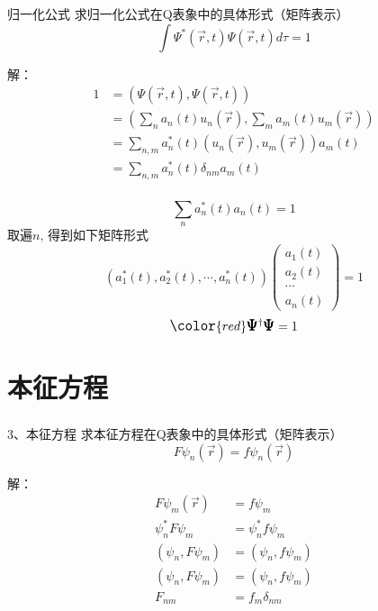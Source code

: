\begin{frame} 
    \frametitle{}
    \begin{tcolorbox1}{归一化公式}
        求归一化公式在Q表象中的具体形式（矩阵表示）
        $$ \int \Psi^* (\vec{r},t) \Psi(\vec{r},t) d\tau =1 $$
    \end{tcolorbox1}
    \alert{解：} 
    \begin{equation*}
        \begin{split}
            1 &=(\Psi(\vec{r},t), \Psi(\vec{r},t)) \\
            &= (\sum_n a_n(t) u_n(\vec{r}), \sum_m a_m(t) u_m(\vec{r}))\\
            &= \sum_{n,m} a_n ^*(t) (u_n(\vec{r}), u_m(\vec{r})) a_m(t)\\
            &= \sum_{n,m} a_n ^*(t) \delta_{nm} a_m(t)\\
        \end{split} 
    \end{equation*}
\end{frame}


\begin{frame} 
    $$  \sum_{n} a_n ^*(t) a_n(t) =1 $$
    取遍$n$, 得到如下矩阵形式\\
    $$ (a_1 ^*(t), a_2 ^*(t),\cdots,a_n^*(t) )
    \begin{pmatrix}
        a_1(t)\\
        a_2(t)\\
        \cdots \\
        a_n(t)
    \end{pmatrix}
    =1 $$ \vspace{1.0em} 
    $$ \large \color{red} \pmb {\Psi} ^{\dagger } \pmb {\Psi} =1 $$

\end{frame}

\section{本征方程}

\begin{frame} 
    \frametitle{}
    \begin{tcolorbox1}{3、本征方程}
        求本征方程在Q表象中的具体形式（矩阵表示）
        $$ F\psi_n (\vec{r}) =f \psi_n (\vec{r})$$
    \end{tcolorbox1}
    \alert{解：} 
    \begin{equation*}
        \begin{split}
            F\psi_m (\vec{r}) &=f \psi_m \\
            \psi_n ^*  F\psi_m &=\psi_n ^* f \psi_m\\
            (\psi_n, F\psi_m )&=(\psi_n, f \psi_m)\\
            (\psi_n, F\psi_m )&=(\psi_n, f \psi_m)\\
            F_{nm} &=f_m \delta_{nm}
        \end{split} 
    \end{equation*}
\end{frame}

